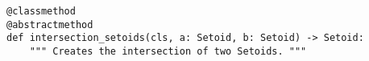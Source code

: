 \begin{verbatim}
@classmethod
@abstractmethod
def intersection_setoids(cls, a: Setoid, b: Setoid) -> Setoid:
    """ Creates the intersection of two Setoids. """
\end{verbatim}